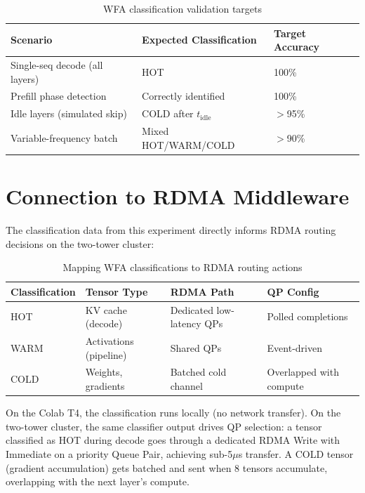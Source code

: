 \documentclass[11pt,letterpaper]{article}
\begin{document}
\begin{table}[htbp]
\centering
\caption{WFA classification validation targets}
\label{tab:validation-targets}
\begin{tabular}{@{}lll@{}}
\toprule
\textbf{Scenario} & \textbf{Expected Classification} & \textbf{Target Accuracy} \\
\midrule
Single-seq decode (all layers) & HOT & 100\% \\
Prefill phase detection & Correctly identified & 100\% \\
Idle layers (simulated skip) & COLD after $t_{\text{idle}}$ & $>$95\% \\
Variable-frequency batch & Mixed HOT/WARM/COLD & $>$90\% \\
\bottomrule
\end{tabular}
\end{table}

\section{Connection to RDMA Middleware}
\label{sec:rdma-connection}

The classification data from this experiment directly informs RDMA routing decisions on the two-tower cluster:

\begin{table}[htbp]
\centering
\caption{Mapping WFA classifications to RDMA routing actions}
\label{tab:wfa-rdma-mapping}
\begin{tabular}{@{}llll@{}}
\toprule
\textbf{Classification} & \textbf{Tensor Type} & \textbf{RDMA Path} & \textbf{QP Config} \\
\midrule
HOT & KV cache (decode) & Dedicated low-latency QPs & Polled completions \\
WARM & Activations (pipeline) & Shared QPs & Event-driven \\
COLD & Weights, gradients & Batched cold channel & Overlapped with compute \\
\bottomrule
\end{tabular}
\end{table}

On the Colab T4, the classification runs locally (no network transfer). On the two-tower cluster, the same classifier output drives QP selection: a tensor classified as HOT during decode goes through a dedicated RDMA Write with Immediate on a priority Queue Pair, achieving sub-5$\mu$s transfer. A COLD tensor (gradient accumulation) gets batched and sent when 8 tensors accumulate, overlapping with the next layer's compute.
\end{document}
